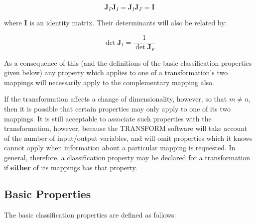 \documentclass[twoside,nolof,11pt]{starlink}
\providecommand{\name}[1]{\small{#1}}
\begin{document}
\begin{equation}
\mathbf{J}_F \mathbf{J}_I = \mathbf{J}_I \mathbf{J}_F = \mathbf{I}
\end{equation}

where $\textbf{I}$ is an identity matrix.
Their determinants will also be related by:

\begin{equation}
\det{\mathbf{J}_I} = \frac{1}{\det{\mathbf{J}_F}}
\end{equation}

As a consequence of this (and the definitions of the basic classification
properties given below) any property which applies to one of a
transformation's two mappings will necessarily apply to the complementary
mapping also.

If the transformation affects a change of dimensionality, however, so that
\mbox{$m \ne n$}, then it is possible that certain properties may only apply
to one of its two mappings.
It is still acceptable to associate such properties with the transformation,
however, because the \name{TRANSFORM} software will take account of the
number of input/output variables, and will omit properties which it knows
cannot apply when information about a particular mapping is requested.
In general, therefore, a classification property may be declared for a
transformation if \underline{\textbf{either}} of its mappings has that property.


\subsection{Basic Properties}

The basic classification properties are defined as follows:
\end{document}

